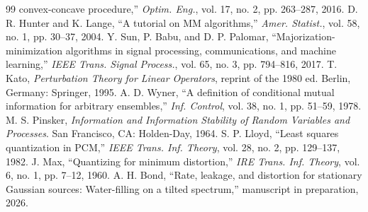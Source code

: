 \documentclass[11pt,onecolumn]{IEEEtran}
\begin{document}
\begin{thebibliography}{99}
convex-concave procedure,'' \emph{Optim. Eng.}, vol. 17, no. 2,
pp. 263--287, 2016.
 D. R. Hunter and K. Lange, ``A tutorial on MM
algorithms,'' \emph{Amer. Statist.}, vol. 58, no. 1, pp. 30--37, 2004.
 Y. Sun, P. Babu, and D. P. Palomar,
``Majorization-minimization algorithms in signal processing,
communications, and machine learning,'' \emph{IEEE Trans. Signal
Process.}, vol. 65, no. 3, pp. 794--816, 2017.
 T. Kato, \emph{Perturbation Theory for Linear Operators},
reprint of the 1980 ed. Berlin, Germany: Springer, 1995.
 A. D. Wyner, ``A definition of conditional mutual
information for arbitrary ensembles,'' \emph{Inf. Control}, vol. 38, no. 1,
pp. 51--59, 1978.
 M. S. Pinsker, \emph{Information and Information
Stability of Random Variables and Processes}. San Francisco, CA:
Holden-Day, 1964.
 S. P. Lloyd, ``Least squares quantization in PCM,''
\emph{IEEE Trans. Inf. Theory}, vol. 28, no. 2, pp. 129--137, 1982.
 J. Max, ``Quantizing for minimum distortion,'' \emph{IRE
Trans. Inf. Theory}, vol. 6, no. 1, pp. 7--12, 1960.
 A. H. Bond, ``Rate, leakage, and distortion for
stationary Gaussian sources: Water-filling on a tilted spectrum,''
manuscript in preparation, 2026.
\end{thebibliography}
\end{document}
